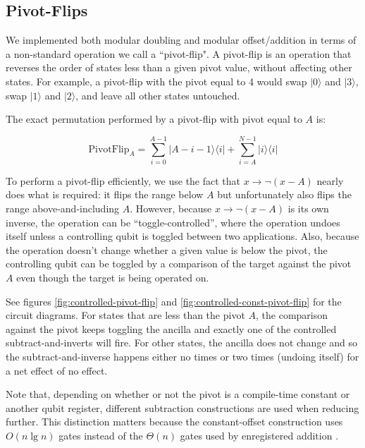\documentclass[twocolumn]{article}
\begin{document}
\subsection{Pivot-Flips} \label{sec:pivot-flips}

We implemented both modular doubling and modular offset/addition in terms of a non-standard operation we call a ``pivot-flip".
A pivot-flip is an operation that reverses the order of states less than a given pivot value, without affecting other states.
For example, a pivot-flip with the pivot equal to 4 would swap $|0\rangle$ and $|3\rangle$, swap $|1\rangle$ and $|2\rangle$, and leave all other states untouched.

The exact permutation performed by a pivot-flip with pivot equal to $A$ is:

$$\text{PivotFlip}_A = \sum_{i=0}^{A-1} |A-i-1\rangle \langle i| + \sum_{i=A}^{N-1} |i\rangle \langle i|$$

To perform a pivot-flip efficiently, we use the fact that $x \rightarrow \lnot(x - A)$ nearly does what is required: it flips the range below $A$ but unfortunately also flips the range above-and-including $A$.
However, because $x \rightarrow \lnot(x - A)$ is its own inverse, the operation can be ``toggle-controlled'', where the operation undoes itself unless a controlling qubit is toggled between two applications.
Also, because the operation doesn't change whether a given value is below the pivot, the controlling qubit can be toggled by a comparison of the target against the pivot $A$ even though the target is being operated on.

See figures \ref{fig:controlled-pivot-flip} and \ref{fig:controlled-const-pivot-flip} for the circuit diagrams.
For states that are less than the pivot $A$, the comparison against the pivot keeps toggling the ancilla and exactly one of the controlled subtract-and-inverts will fire.
For other states, the ancilla does not change and so the subtract-and-inverse happens either no times or two times (undoing itself) for a net effect of no effect.

Note that, depending on whether or not the pivot is a compile-time constant or another qubit register, different subtraction constructions are used when reducing further.
This distinction matters because the constant-offset construction uses $O(n \lg n)$ gates \cite{haner2016} instead of the $\Theta(n)$ gates used by enregistered addition \cite{takahashi2005}.
\end{document}
